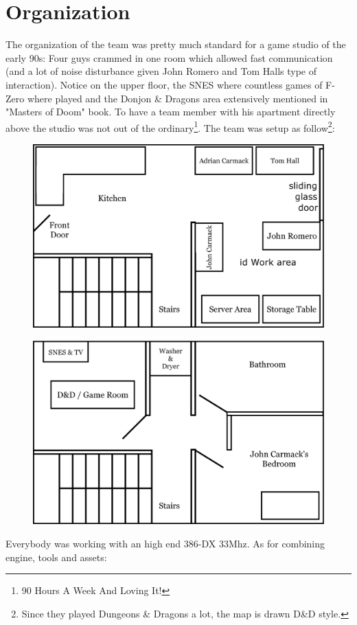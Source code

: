 \documentclass[book.tex]{subfiles}
\begin{document}
\section{Organization}
The organization of the team was pretty much standard for a game studio of the early 90s: Four guys crammed in one room which allowed fast communication (and a lot of noise disturbance given John Romero and Tom Halls type of interaction). Notice on the upper floor, the SNES where countless games of F-Zero where played and the Donjon \& Dragons area extensively mentioned in "Masters of Doom" book. To have a team member with his apartment directly above the studio was not out of the ordinary\footnote{90 Hours A Week And Loving It!}. The team was setup as follow\footnote{Since they played Dungeons \& Dragons a lot, the map is drawn D\&D style.}:
\par
\begin{figure}[H]
  \centering
  \includegraphics[width=\textwidth]{imgs/drawings/map/id-software-office-madison_bottom_floor.eps}
\end{figure}
\par
\begin{figure}[H]
  \centering
  \includegraphics[width=\textwidth]{imgs/drawings/map/id-software-office-madison_top_floor.eps}
\end{figure}
Everybody was working with an high end 386-DX 33Mhz. As for combining engine, tools and assets:\\
\end{document}
